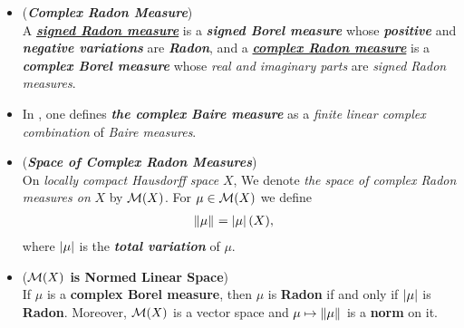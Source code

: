 \documentclass[11pt]{article}
\begin{document}
\begin{itemize}
\item \begin{definition} (\emph{\textbf{Complex Radon Measure}})\\
A \underline{\emph{\textbf{signed Radon measure}}} is a \emph{\textbf{signed Borel measure}} whose \emph{\textbf{positive}} and \emph{\textbf{negative variations}} are \emph{\textbf{Radon}}, and a \underline{\emph{\textbf{complex Radon measure}}} is a \emph{\textbf{complex Borel measure}} whose \emph{real and imaginary parts} are \textit{signed Radon measures}. 
\end{definition}

\item \begin{remark}
In \citep{reed1980methods}, one defines \emph{\textbf{the complex Baire measure}} as a \emph{finite linear complex combination} of \emph{Baire measures}. 
\end{remark}

\item \begin{definition} (\emph{\textbf{Space of Complex Radon Measures}})\\
On \emph{locally compact Hausdorff space} $X$, We denote \emph{the space of complex Radon measures
on} $X$ by ${\mathcal M}(X)$. For $\mu \in {\mathcal M}(X)$ we define
\begin{align*}
\left\|\mu\right\|_{} &= \left\lvert \mu \right\rvert(X),
\end{align*}
where $ \left\lvert \mu \right\rvert$ is the \emph{\textbf{total variation}} of $\mu$.  
\end{definition}

\item \begin{proposition} (\textbf{${\mathcal M}(X)$ is Normed Linear Space}) \citep{folland2013real}\\
If $\mu$ is a \textbf{complex Borel measure}, then $\mu$ is \textbf{Radon} if and only if $\left\lvert \mu \right\rvert$ is \textbf{Radon}.
Moreover, ${\mathcal M}(X)$ is a vector space and $\mu \mapsto \left\|\mu\right\|_{}$ is a \textbf{norm} on it.
\end{proposition}




\end{itemize}
\end{document}
